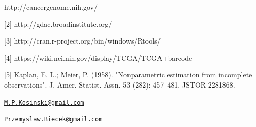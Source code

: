 \newpage

\begin{Schunk}
\begin{Sinput}
[1] http://cancergenome.nih.gov/

[2] http://gdac.broadinstitute.org/
   
[3] http://cran.r-project.org/bin/windows/Rtools/
   
[4] https://wiki.nci.nih.gov/display/TCGA/TCGA+barcode

[5]  Kaplan, E. L.; Meier, P. (1958). "Nonparametric estimation from incomplete observations". J. Amer. Statist. Assn. 53 (282): 457–481. JSTOR 2281868.


\end{Sinput}
\end{Schunk}

\address{
Marcin Kosinski\\
Warsaw University of Technology\\
Faculty of Mathematics and Information Science\\ Koszykowa 75, 00-662 Warsaw, Poland\\
}
\href{mailto:M.P.Kosinski@gmail.com}{\nolinkurl{M.P.Kosinski@gmail.com}}

\address{
Przemysław Biecek\\
University of Warsaw\\
line 1\\ line 2\\
}
\href{mailto:Przemyslaw.Biecek@gmail.com}{\nolinkurl{Przemyslaw.Biecek@gmail.com}}

